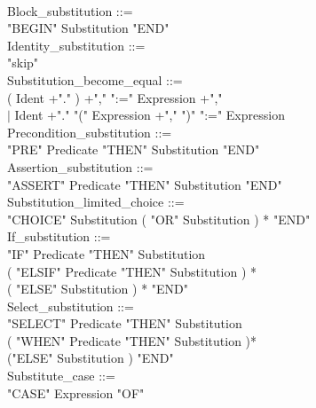 \documentclass[12pt,a4paper,draft]{article}
\begin{document}
{\begin{sloppypar}
 \\ 
Block\_substitution ::= \\ 
  "BEGIN"  Substitution  "END" \\ 
Identity\_substitution ::= \\ 
  "skip"\\ 
Substitution\_become\_equal ::= \\ 
  ( Ident +"."  ) +","   ":="  Expression +","\\
  \hspace*{0.20in} $|$ Ident +"."  "(" Expression +","  ")"  ":="  Expression \\ 
Precondition\_substitution ::= \\ 
  \hspace*{0.20in}   "PRE"  Predicate  "THEN"  Substitution  "END" \\ 
Assertion\_substitution ::= \\ 
  \hspace*{0.20in}  "ASSERT"  Predicate  "THEN"  Substitution  "END" \\ 
Substitution\_limited\_choice ::= \\ 
  \hspace*{0.20in}  "CHOICE" Substitution ( "OR" Substitution ) *  "END" \\ 
If\_substitution ::= \\ 
  \hspace*{0.20in}  "IF"  Predicate  "THEN"  Substitution\\ 
  \hspace*{0.20in}   ( "ELSIF"  Predicate  "THEN"  Substitution  ) * \\   %
  \hspace*{0.20in}   ( "ELSE"  Substitution ) *  "END" \\   %
Select\_substitution ::= \\ 
  \hspace*{0.20in}  "SELECT"  Predicate  "THEN"  Substitution \\ 
  \hspace*{0.20in} ( "WHEN"  Predicate  "THEN"  Substitution )*\\ 
  \hspace*{0.20in} ("ELSE"  Substitution )  "END"\\  %
Substitute\_case ::= \\ 
  \hspace*{0.20in}  "CASE"  Expression  "OF"\\ 

\end{sloppypar}}
\end{document}
